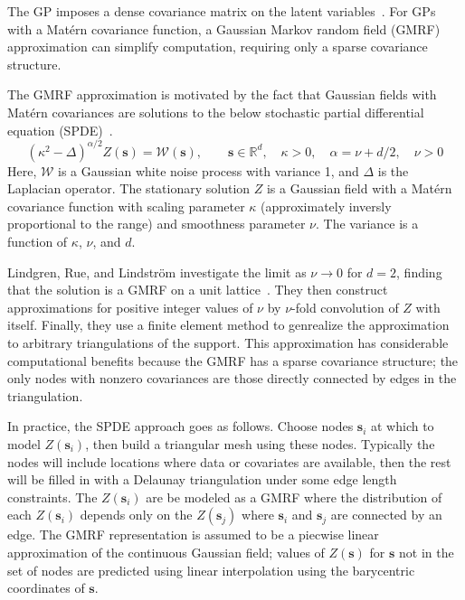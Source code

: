 \documentclass[]{interact}
\begin{document}
The GP imposes a dense covariance matrix on the latent variables~\cite{rinla}.
For GPs with a Mat\'{e}rn covariance function, a Gaussian Markov random field
(GMRF) approximation can simplify computation, requiring only a sparse
covariance structure.

The GMRF approximation is motivated by the fact that Gaussian fields with
Mat\'{e}rn covariances are solutions to the below stochastic partial
differential equation (SPDE)~\cite{lindgrenetal}.
\begin{displaymath}
(\kappa^{2} - \Delta)^{\alpha / 2} Z(\mathbf{s}) = \mathcal{W}(\mathbf{s}),
\qquad \mathbf{s} \in \mathbb{R}^d, \quad \kappa > 0,
\quad \alpha = \nu + d/2, \quad \nu > 0
\end{displaymath}
Here, \(\mathcal{W}\) is a Gaussian white noise process with variance 1, and
\(\Delta\) is the Laplacian operator. The stationary solution \(Z\) is a
Gaussian field with a Mat\'{e}rn covariance function with scaling parameter
\(\kappa\) (approximately inversly proportional to the range) and smoothness
parameter \(\nu\). The variance is a function of \(\kappa\), \(\nu\), and
\(d\).

Lindgren, Rue, and Lindstr\"{o}m investigate the limit as \(\nu \to 0\) for
\(d = 2\), finding that the solution is a GMRF on a unit
lattice~\cite{lindgrenetal}. They then construct approximations for positive
integer values of \(\nu\) by \(\nu\)-fold convolution of \(Z\) with itself.
Finally, they use a finite element method to genrealize the approximation
to arbitrary triangulations of the support. This approximation has considerable
computational benefits because the GMRF has a sparse covariance structure; the
only nodes with nonzero covariances are those directly connected by edges in
the triangulation.

In practice, the SPDE approach goes as follows. Choose nodes \(\mathbf{s}_{i}\)
at which to model \(Z(\mathbf{s}_{i})\), then build a triangular mesh using these
nodes. Typically the nodes will include locations where data or covariates are
available, then the rest will be filled in with a Delaunay triangulation under
some edge length constraints. The \(Z(\mathbf{s}_{i})\) are be modeled as a
GMRF where the distribution of each \(Z(\mathbf{s}_{i})\) depends only on the
\(Z(\mathbf{s}_{j})\) where \(\mathbf{s}_{i}\) and \(\mathbf{s}_{j}\) are
connected by an edge. The GMRF representation is assumed to be a piecwise
linear approximation of the continuous Gaussian field; values of
\(Z(\mathbf{s})\) for \(\mathbf{s}\) not in the set of nodes are predicted
using linear interpolation using the barycentric coordinates of
\(\mathbf{s}\).
\end{document}

